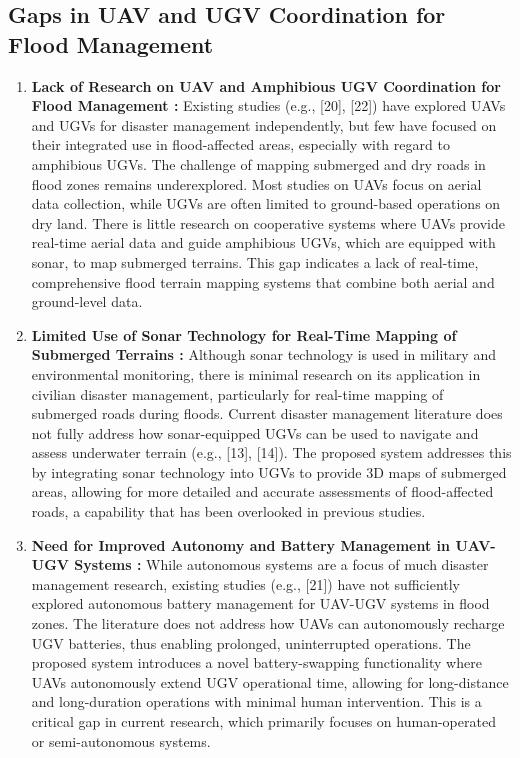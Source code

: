 \documentclass[conference]{IEEEtran}
\begin{document}
\subsection{\textbf{Gaps in UAV and UGV Coordination for Flood Management}}
\begin{enumerate}
    \item \textbf{ Lack of Research on UAV and Amphibious UGV Coordination for Flood Management : }
Existing studies (e.g., [20], [22]) have explored UAVs and UGVs for disaster management independently, but few have focused on their integrated use in flood-affected areas, especially with regard to amphibious UGVs. The challenge of mapping submerged and dry roads in flood zones remains underexplored. Most studies on UAVs focus on aerial data collection, while UGVs are often limited to ground-based operations on dry land. There is little research on cooperative systems where UAVs provide real-time aerial data and guide amphibious UGVs, which are equipped with sonar, to map submerged terrains. This gap indicates a lack of real-time, comprehensive flood terrain mapping systems that combine both aerial and ground-level data.    
  
	\item \textbf{ Limited Use of Sonar Technology for Real-Time Mapping of Submerged Terrains : }
	Although sonar technology is used in military and environmental monitoring, there is minimal research on its application in civilian disaster management, particularly for real-time mapping of submerged roads during floods. Current disaster management literature does not fully address how sonar-equipped UGVs can be used to navigate and assess underwater terrain (e.g., [13], [14]). The proposed system addresses this by integrating sonar technology into UGVs to provide 3D maps of submerged areas, allowing for more detailed and accurate assessments of flood-affected roads, a capability that has been overlooked in previous studies.

	
	\item \textbf{ Need for Improved Autonomy and Battery Management in UAV-UGV Systems : }
While autonomous systems are a focus of much disaster management research, existing studies (e.g., [21]) have not sufficiently explored autonomous battery management for UAV-UGV systems in flood zones. The literature does not address how UAVs can autonomously recharge UGV batteries, thus enabling prolonged, uninterrupted operations. The proposed system introduces a novel battery-swapping functionality where UAVs autonomously extend UGV operational time, allowing for long-distance and long-duration operations with minimal human intervention. This is a critical gap in current research, which primarily focuses on human-operated or semi-autonomous systems.	
	

\end{enumerate}
\end{document}
